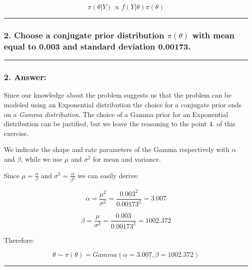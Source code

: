\documentclass[
]{article}
\begin{document}
\[
\pi(\theta | Y) \propto f(Y | \theta) \pi(\theta)
\]

\begin{center}\rule{0.5\linewidth}{0.5pt}\end{center}

\hypertarget{choose-a-conjugate-prior-distribution-pitheta-with-mean-equal-to-0.003-and-standard-deviation-0.00173.}{%
\subsubsection{\texorpdfstring{2. Choose a conjugate prior distribution
\(\pi(\theta)\) with mean equal to 0.003 and standard deviation
0.00173.}{2. Choose a conjugate prior distribution \textbackslash pi(\textbackslash theta) with mean equal to 0.003 and standard deviation 0.00173.}}\label{choose-a-conjugate-prior-distribution-pitheta-with-mean-equal-to-0.003-and-standard-deviation-0.00173.}}

\begin{center}\rule{0.5\linewidth}{0.5pt}\end{center}

\hypertarget{answer-5}{%
\subsubsection{2. Answer:}\label{answer-5}}

Since our knowledge about the problem suggests us that the problem can
be modeled using an Exponential distribution the choice for a conjugate
prior ends on a \emph{Gamma distribution}. The choice of a Gamma prior
for an Exponential distribution can be justified, but we leave the
reasoning to the point \(4.\) of this exercise.

We indicate the shape and rate parameters of the Gamma respectively with
\(\alpha\) and \(\beta\), while we use \(\mu\) and \(\sigma^2\) for mean
and variance.

Since \(\mu = \frac{\alpha}{\beta}\) and
\(\sigma^2 = \frac{\alpha}{\beta^2}\) we can easily derive:

\[
\alpha = \frac{\mu^2}{\sigma^2} = \frac{0.003^2}{0.00173^2} = 3.007
\]

\[
\beta = \frac{\mu}{\sigma^2} = \frac{0.003}{0.00173^2} = 1002.372
\]

Therefore:

\[
\theta \sim \pi(\theta) = Gamma(\alpha = 3.007, \beta = 1002.372)
\]

\begin{center}\rule{0.5\linewidth}{0.5pt}\end{center}
\end{document}
